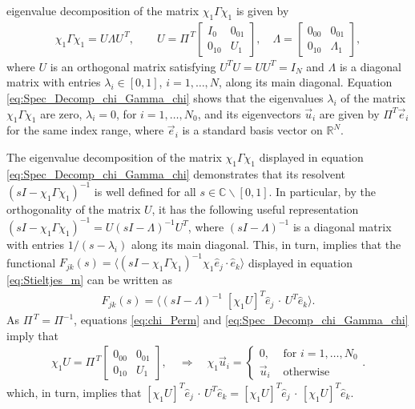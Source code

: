 \documentclass{cmslatex}
\begin{document}
eigenvalue decomposition of the matrix $\chi_1\Gamma\chi_1$ is given by 
%
\begin{align}\label{eq:Spec_Decomp_chi_Gamma_chi}
\chi_1\Gamma\chi_1=U\Lambda U^{\,T},
\qquad
U=\Pi^{\,T}\left[
  \begin{array}{ccc}
    I_0&0_{01}\\
    0_{10}&U_1   
    \end{array}
\right],
\quad
\Lambda=\left[
  \begin{array}{ccc}
    0_{00}&0_{01}\\
    0_{10}&\Lambda_1   
    \end{array}
\right],
\end{align}
%
where $U$ is an orthogonal matrix satisfying $U^TU=UU^T=I_N$ and
$\Lambda$ is a diagonal matrix with entries $\lambda_i\in[0,1]$, $i=1,\ldots,N$, along
its main diagonal. Equation \eqref{eq:Spec_Decomp_chi_Gamma_chi} shows
that the eigenvalues $\lambda_i$ of the matrix $\chi_1\Gamma\chi_1$ are zero, $\lambda_i=0$,
for $i=1,\ldots,N_0$, and its eigenvectors $\vec{u}_i$ are given by
$\Pi^T\vec{e}_i$ for the same index range, where $\vec{e}_i$ is a
standard basis vector on $\mathbb{R}^N$. 





The eigenvalue decomposition of the matrix $\chi_1\Gamma\chi_1$ displayed in
equation \eqref{eq:Spec_Decomp_chi_Gamma_chi} demonstrates that its
resolvent $(sI-\chi_1\Gamma\chi_1)^{-1}$ is well defined for all
$s\in\mathbb{C}\backslash[0,1]$. In particular, by the orthogonality of the
matrix $U$, it has the following useful representation
$(sI-\chi_1\Gamma\chi_1)^{-1}=U(sI-\Lambda)^{-1}U^T$, where $(sI-\Lambda)^{-1}$ is a diagonal
matrix with entries $1/(s-\lambda_i)$ along its main diagonal. This, in
turn, implies that the functional
$F_{jk}(s)=\langle(sI-\chi_1\Gamma\chi_1)^{-1}\chi_1\hat{e}_j\cdot\hat{e}_k\rangle$ 
displayed in equation \eqref{eq:Stieltjes_m} can be written as     
%
\begin{align}\label{eq:Matrix_Functional_proof}
  F_{jk}(s)%
          =\langle(sI-\Lambda)^{-1}\;[\chi_1U]^T\hat{e}_j\,\cdot\,U^T\hat{e}_k\rangle. 
\end{align}
%
As
$\Pi^{\,T}=\Pi^{-1}$, equations \eqref{eq:chi_Perm} and
\eqref{eq:Spec_Decomp_chi_Gamma_chi} imply that
%
\begin{align}\label{eq:Projection_Eigenspace}
  \chi_1U=\Pi^{\,T}\left[
  \begin{array}{ccc}
    0_{00}&0_{01}\\
    0_{10}&U_1  
    \end{array}
\right],
\quad
\Longrightarrow
\quad
\chi_1\vec{u}_i=
  \begin{cases}
  0, &\text{ for } i=1,\ldots,N_0  \\
  \vec{u}_i  &\text{ otherwise}
  \end{cases}.
\end{align}
%
which, in turn, implies that
$[\chi_1U]^T\hat{e}_j\,\cdot\,U^T\hat{e}_k=[\chi_1U]^T\hat{e}_j\,\cdot\,[\chi_1U]^T\hat{e}_k$.
\end{document}
